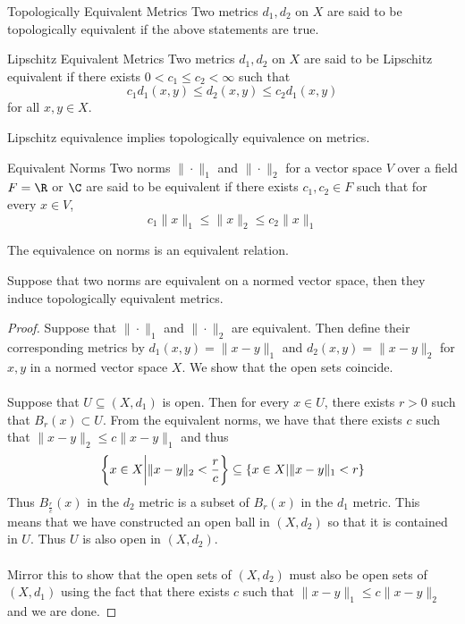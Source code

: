 \begin{defn}{Topologically Equivalent Metrics}{} Two metrics $d_1,d_2$ on $X$ are said to be topologically equivalent if the above statements are true. 
\end{defn}

\begin{defn}{Lipschitz Equivalent Metrics}{} Two metrics $d_1,d_2$ on $X$ are said to be Lipschitz equivalent if there exists $0<c_1\leq c_2<\infty$ such that $$c_1d_1(x,y)\leq d_2(x,y)\leq c_2d_1(x,y)$$ for all $x,y\in X$. 
\end{defn}

\begin{lmm}{}{} Lipschitz equivalence implies topologically equivalence on metrics. 
\end{lmm}

\begin{defn}{Equivalent Norms}{} Two norms $\|\cdot\|_1$ and $\|\cdot\|_2$ for a vector space $V$ over a field $F=\R$ or $\C$ are said to be equivalent if there exists $c_1,c_2\in F$ such that for every $x\in V$, $$c_1\|x\|_1\leq\|x\|_2\leq c_2\|x\|_1$$
\end{defn}

\begin{prp}{}{} The equivalence on norms is an equivalent relation. 
\end{prp}

\begin{prp}{}{} Suppose that two norms are equivalent on a normed vector space, then they induce topologically equivalent metrics. \tcbline
\begin{proof}
Suppose that $\|\cdot\|_1$ and $\|\cdot\|_2$ are equivalent. Then define their corresponding metrics by $d_1(x,y)=\|x-y\|_1$ and $d_2(x,y)=\|x-y\|_2$ for $x,y$ in a normed vector space $X$. We show that the open sets coincide. \\~\\
Suppose that $U\subseteq(X,d_1)$ is open. Then for every $x\in U$, there exists $r>0$ such that $B_r(x)\subset U$. From the equivalent norms, we have that there exists $c$ such that $\|x-y\|_2\leq c\|x-y\|_1$ and thus $$\left\{x\in X\bigg{|}\|x-y\|_2<\frac{r}{c}\right\}\subseteq\{x\in X|\|x-y\|_1<r\}$$ Thus $B_{\frac{r}{c}}(x)$ in the $d_2$ metric is a subset of $B_r(x)$ in the $d_1$ metric. This means that we have constructed an open ball in $(X,d_2)$ so that it is contained in $U$. Thus $U$ is also open in $(X,d_2)$. \\~\\
Mirror this to show that the open sets of $(X,d_2)$ must also be open sets of $(X,d_1)$ using the fact that there exists $c$ such that $\|x-y\|_1\leq c\|x-y\|_2$ and we are done. 
\end{proof}
\end{prp}

